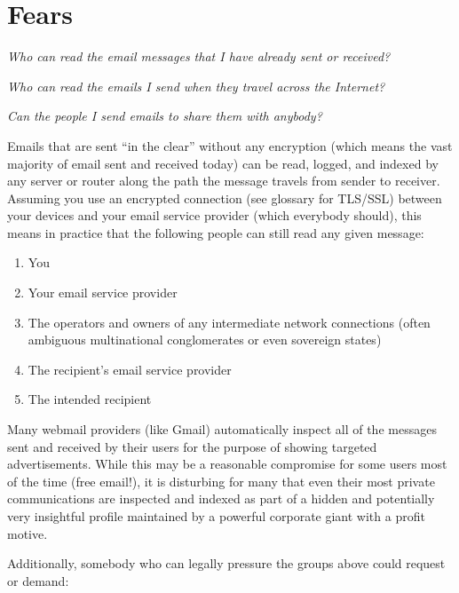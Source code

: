 \section{Fears}

\emph{Who can read the email messages that I have already sent or
received?}

\emph{Who can read the emails I send when they travel across the
Internet?}

\emph{Can the people I send emails to share them with anybody?}

Emails that are sent ``in the clear'' without any encryption (which
means the vast majority of email sent and received today) can be read,
logged, and indexed by any server or router along the path the message
travels from sender to receiver. Assuming you use an encrypted
connection (see glossary for TLS/SSL) between your devices and your
email service provider (which everybody should), this means in practice
that the following people can still read any given message:

\begin{enumerate}[1.]
\item
  You
\item
  Your email service provider
\item
  The operators and owners of any intermediate network connections
  (often ambiguous multinational conglomerates or even sovereign states)
\item
  The recipient's email service provider
\item
  The intended recipient
\end{enumerate}
Many webmail providers (like Gmail) automatically inspect all of the
messages sent and received by their users for the purpose of showing
targeted advertisements. While this may be a reasonable compromise for
some users most of the time (free email!), it is disturbing for many
that even their most private communications are inspected and indexed as
part of a hidden and potentially very insightful profile maintained by a
powerful corporate giant with a profit motive.

Additionally, somebody who can legally pressure the groups above could
request or demand:

